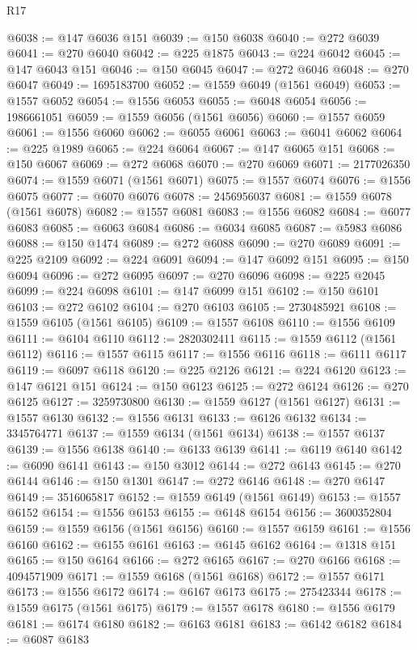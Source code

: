 \begin{lexlean}{R17}
\begin{coremodule}
@6038 := @147 @6036 @151
@6039 := @150 @6038
@6040 := @272 @6039
@6041 := @270 @6040
@6042 := @225 @1875
@6043 := @224 @6042
@6045 := @147 @6043 @151
@6046 := @150 @6045
@6047 := @272 @6046
@6048 := @270 @6047
@6049 := 1695183700
@6052 := @1559 @6049 (@1561 @6049)
@6053 := @1557 @6052
@6054 := @1556 @6053
@6055 := @6048 @6054
@6056 := 1986661051
@6059 := @1559 @6056 (@1561 @6056)
@6060 := @1557 @6059
@6061 := @1556 @6060
@6062 := @6055 @6061
@6063 := @6041 @6062
@6064 := @225 @1989
@6065 := @224 @6064
@6067 := @147 @6065 @151
@6068 := @150 @6067
@6069 := @272 @6068
@6070 := @270 @6069
@6071 := 2177026350
@6074 := @1559 @6071 (@1561 @6071)
@6075 := @1557 @6074
@6076 := @1556 @6075
@6077 := @6070 @6076
@6078 := 2456956037
@6081 := @1559 @6078 (@1561 @6078)
@6082 := @1557 @6081
@6083 := @1556 @6082
@6084 := @6077 @6083
@6085 := @6063 @6084
@6086 := @6034 @6085
@6087 := @5983 @6086
@6088 := @150 @1474
@6089 := @272 @6088
@6090 := @270 @6089
@6091 := @225 @2109
@6092 := @224 @6091
@6094 := @147 @6092 @151
@6095 := @150 @6094
@6096 := @272 @6095
@6097 := @270 @6096
@6098 := @225 @2045
@6099 := @224 @6098
@6101 := @147 @6099 @151
@6102 := @150 @6101
@6103 := @272 @6102
@6104 := @270 @6103
@6105 := 2730485921
@6108 := @1559 @6105 (@1561 @6105)
@6109 := @1557 @6108
@6110 := @1556 @6109
@6111 := @6104 @6110
@6112 := 2820302411
@6115 := @1559 @6112 (@1561 @6112)
@6116 := @1557 @6115
@6117 := @1556 @6116
@6118 := @6111 @6117
@6119 := @6097 @6118
@6120 := @225 @2126
@6121 := @224 @6120
@6123 := @147 @6121 @151
@6124 := @150 @6123
@6125 := @272 @6124
@6126 := @270 @6125
@6127 := 3259730800
@6130 := @1559 @6127 (@1561 @6127)
@6131 := @1557 @6130
@6132 := @1556 @6131
@6133 := @6126 @6132
@6134 := 3345764771
@6137 := @1559 @6134 (@1561 @6134)
@6138 := @1557 @6137
@6139 := @1556 @6138
@6140 := @6133 @6139
@6141 := @6119 @6140
@6142 := @6090 @6141
@6143 := @150 @3012
@6144 := @272 @6143
@6145 := @270 @6144
@6146 := @150 @1301
@6147 := @272 @6146
@6148 := @270 @6147
@6149 := 3516065817
@6152 := @1559 @6149 (@1561 @6149)
@6153 := @1557 @6152
@6154 := @1556 @6153
@6155 := @6148 @6154
@6156 := 3600352804
@6159 := @1559 @6156 (@1561 @6156)
@6160 := @1557 @6159
@6161 := @1556 @6160
@6162 := @6155 @6161
@6163 := @6145 @6162
@6164 := @1318 @151
@6165 := @150 @6164
@6166 := @272 @6165
@6167 := @270 @6166
@6168 := 4094571909
@6171 := @1559 @6168 (@1561 @6168)
@6172 := @1557 @6171
@6173 := @1556 @6172
@6174 := @6167 @6173
@6175 := 275423344
@6178 := @1559 @6175 (@1561 @6175)
@6179 := @1557 @6178
@6180 := @1556 @6179
@6181 := @6174 @6180
@6182 := @6163 @6181
@6183 := @6142 @6182
@6184 := @6087 @6183

\end{coremodule}
\end{lexlean}
